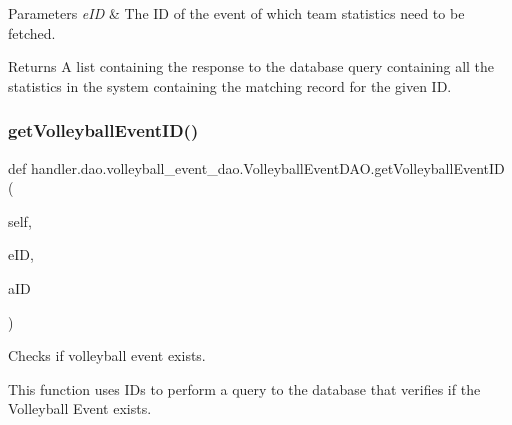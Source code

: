 \begin{DoxyParams}{Parameters}
{\em e\+ID} & The ID of the event of which team statistics need to be fetched.\\
\hline
\end{DoxyParams}
\begin{DoxyReturn}{Returns}
A list containing the response to the database query containing all the statistics in the system containing the matching record for the given ID. 
\end{DoxyReturn}
\mbox{\label{classhandler_1_1dao_1_1volleyball__event__dao_1_1_volleyball_event_d_a_o_a98ba628ab39ff88b057cdc8b90941c9f}} 
\subsubsection{\texorpdfstring{get\+Volleyball\+Event\+I\+D()}{getVolleyballEventID()}}
{\footnotesize\ttfamily def handler.\+dao.\+volleyball\+\_\+event\+\_\+dao.\+Volleyball\+Event\+D\+A\+O.\+get\+Volleyball\+Event\+ID (\begin{DoxyParamCaption}\item[{}]{self,  }\item[{}]{e\+ID,  }\item[{}]{a\+ID }\end{DoxyParamCaption})}



Checks if volleyball event exists. 

This function uses I\+Ds to perform a query to the database that verifies if the Volleyball Event exists.


